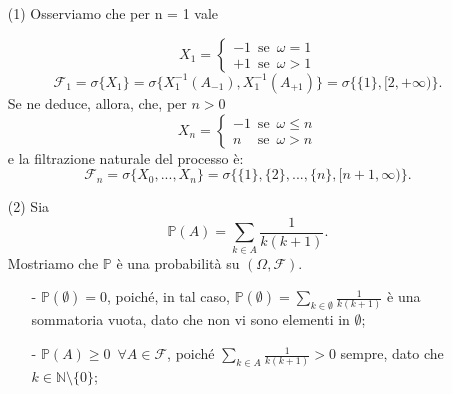 \documentclass[12pt]{homework}
\begin{document}
\subsection*{ }
  \begin{enumerate}
  \item[(1)]
Osserviamo che per   n = 1 vale

  \[X_{1}=\begin{cases}-1 \,\,\, \text{se} \,\,\, \omega=1\\    +1 \,\,\, \text{se} \,\,\, \omega> 1\end{cases}\]
  \begin{equation*}
  \mathcal{F}_{1}=\sigma\{X_1\}=\sigma\{X_1^{-1}(A_{-1}), X_1^{-1}(A_{+1})\} = \sigma\{\{1\},[2, +\infty)\}.
  \end{equation*}
  Se ne deduce, allora, che, per $n > 0$
  \[X_{n}=\begin{cases}-1 \,\,\, \text{se} \,\,\, \omega\leq n\\    n \,\,\,\,\,\,\, \text{se} \,\,\, \omega> n\end{cases}\]
  e la filtrazione naturale del processo è: 
  \begin{equation*}
  \mathcal{F}_{n}=\sigma\{X_{0},...,X_{n}\}=\sigma\{\{1\},\{2\},...,\{n\}, [n+1
  , \infty)\}.
  \end{equation*}
  \item[(2)]
  Sia
  \begin{equation*}
  \mathbb{P}\left(A\right)=\sum_{k\in A}\frac{1}{k\left(k+1\right)}.
  \end{equation*}
  Mostriamo che $\mathbb{P}$ è una probabilità su $\left(\Omega,\mathcal{F}\right)$.
  \begin{itemize}
  \item[-]
  $\mathbb{P}\left(\emptyset\right)=0$, poiché, in tal caso, $\mathbb{P}\left(\emptyset\right)=\sum_{k\in \emptyset}\frac{1}{k\left(k+1\right)}$ è una sommatoria vuota, dato che non vi sono elementi in $\emptyset$;
  \item[-]
  $\mathbb{P}\left(A\right)\geq 0 \,\,\,\forall A\in \mathcal{F}$, poiché $\sum_{k\in A}\frac{1}{k\left(k+1\right)}> 0$ sempre, dato che $k \in \mathbb{N}\setminus\{0\}$;\\

\end{itemize}
\end{enumerate}
\end{document}
